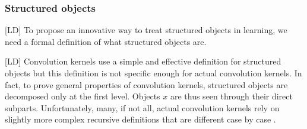 \documentclass[twoside,11pt]{article}
\newcounter{properties}
\def\finalcomment#1#2{}
\def\mysecondremove#1{}
\def\mysecondinsert#1{#1}
\def\LD#1{[{\color{blue}L}D] {\color{blue}#1}}
\begin{document}
\subsubsection{Structured objects}

\LD{To propose an innovative way to treat structured objects in learning, we need a formal definition of what structured objects are.} 






\LD{Convolution kernels use a simple and effective definition for structured objects \cite{Haussler99convolutionkernels} but this definition is not specific enough for actual convolution kernels.} In fact, to prove general properties of convolution kernels, 
structured objects are decomposed only at the first level. Objects $x$ are thus seen through their direct subparts. Unfortunately, many, if not all, actual convolution kernels rely on slightly more complex recursive definitions that are different case by case \cite{Collins2002,Kimura:2011:SKR:2017863.2017871,Aiolli2009,Lodhi:2002:TCU:944790.944799,Kashima:2002:KSD:645531.656021,Moschitti2006b,Croce:2011:SLS:2145432.2145544,Mehdad:2010:SST:1857999.1858144}.


\finalcomment{In Section 2, the authors show a lot of goodwill and try to simplify the analysis of the paper to make it intuitive. I have, however, struggled with the notations (again). What is $G_{X_i}$ ? isn't there a unique ground set? $\omega_i$ is used in the middle of p.5 in a string context, it's used 3 lines below as (what I guess is) a real number. In the same page, "A possible set R(t)", but what such sets R actually mean is not defined. Bottom of  p.6 and p.7, the set S(z) has no definition either.}{R3.2}
\end{document}
